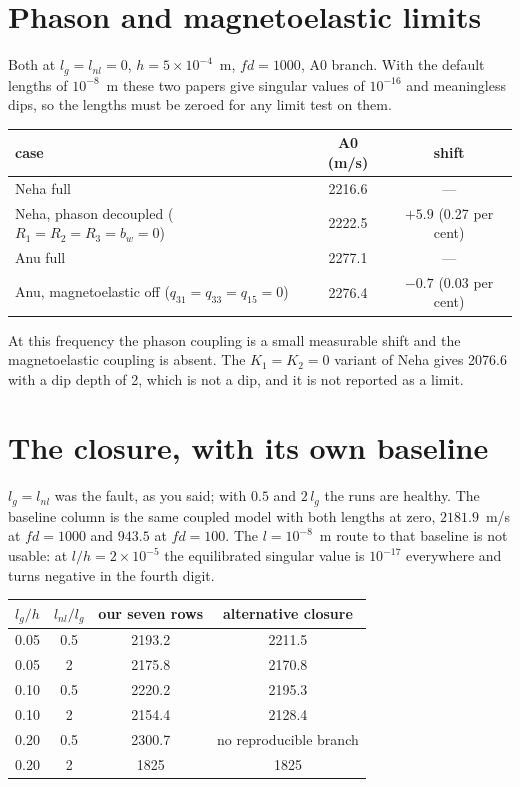 \documentclass[11pt,a4paper]{article}
\begin{document}
\section*{Phason and magnetoelastic limits}

Both at $l_g=l_{nl}=0$, $h=5\times10^{-4}$~m, $fd=1000$, A0 branch. With the default lengths of
$10^{-8}$~m these two papers give singular values of $10^{-16}$ and meaningless dips, so the lengths
must be zeroed for any limit test on them.

\begin{center}\footnotesize
\begin{tabular}{lcc}
\toprule
case & A0 (m/s) & shift\\
\midrule
Neha full & 2216.6 & ---\\
Neha, phason decoupled ($R_1=R_2=R_3=b_w=0$) & 2222.5 & $+5.9$ (0.27 per cent)\\
Anu full & 2277.1 & ---\\
Anu, magnetoelastic off ($q_{31}=q_{33}=q_{15}=0$) & 2276.4 & $-0.7$ (0.03 per cent)\\
\bottomrule
\end{tabular}
\end{center}

At this frequency the phason coupling is a small measurable shift and the magnetoelastic coupling is
absent. The $K_1=K_2=0$ variant of Neha gives 2076.6 with a dip depth of 2, which is not a dip, and
it is not reported as a limit.

\section*{The closure, with its own baseline}

$l_g=l_{nl}$ was the fault, as you said; with $0.5$ and $2\,l_g$ the runs are healthy. The baseline
column is the same coupled model with both lengths at zero, $2181.9$~m/s at $fd=1000$ and $943.5$ at
$fd=100$. The $l=10^{-8}$~m route to that baseline is not usable: at $l/h=2\times10^{-5}$ the
equilibrated singular value is $10^{-17}$ everywhere and turns negative in the fourth digit.

\begin{center}\footnotesize
\begin{tabular}{cccc}
\toprule
$l_g/h$ & $l_{nl}/l_g$ & our seven rows & alternative closure\\
\midrule
0.05 & 0.5 & 2193.2 & 2211.5\\
0.05 & 2 & 2175.8 & 2170.8\\
0.10 & 0.5 & 2220.2 & 2195.3\\
0.10 & 2 & 2154.4 & 2128.4\\
0.20 & 0.5 & 2300.7 & no reproducible branch\\
0.20 & 2 & 1825 & 1825\\
\bottomrule
\end{tabular}
\end{center}
\end{document}

